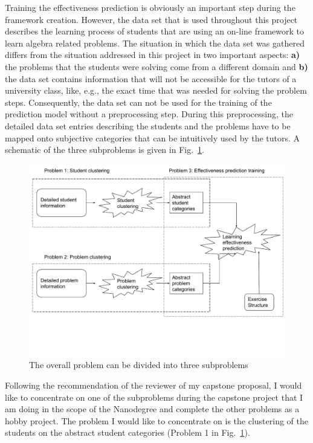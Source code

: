 Training the effectiveness prediction is obviously an important step during the framework creation. However, the data set that is used throughout this project describes the learning process of students that are using an on-line framework to learn algebra related problems. The situation in which the data set was gathered differs from the situation addressed in this project in two important aspects: \textbf{a)} the problems that the students were solving come from a different domain and  \textbf{b)} the data set contains information that will not be accessible for the tutors of a university class, like, e.g., the exact time that was needed for solving the problem steps. Consequently, the data set can not be used for the training of the prediction model without a preprocessing step. During this preprocessing, the detailed data set entries describing the students and the problems have to be mapped onto subjective categories that can be intuitively used by the tutors. A schematic of the three subproblems is given in Fig.~\ref{fig_sub_problems}.

\begin{figure}
	\centering
	\includegraphics[width=\textwidth]{./img/subProblems.pdf}
	\caption{The overall problem can be divided into three subproblems \label{fig_sub_problems}}
\end{figure}

Following the recommendation of the reviewer of my capstone proposal, I would like to concentrate on one of the subproblems during the capstone project that I am doing in the scope of the Nanodegree and complete the other problems as a hobby project. The problem I would like to concentrate on is the clustering of the students on the abstract student categories (Problem 1 in Fig.~\ref{fig_sub_problems}).

